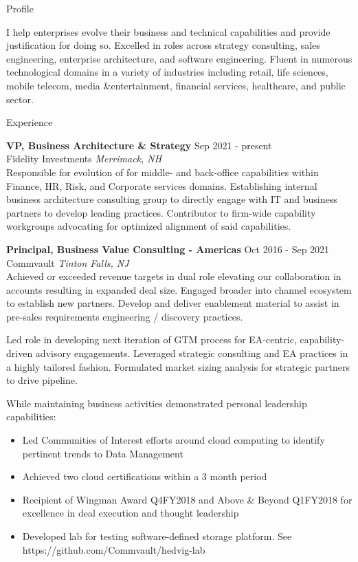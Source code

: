 \documentclass{resume} %
\begin{document}
\begin{rSection}{Profile}

I help enterprises evolve their business and technical capabilities and provide justification for doing so. Excelled in roles across strategy consulting, sales engineering, enterprise architecture, and software engineering. Fluent in numerous technological domains in a variety of industries including retail, life sciences, mobile telecom, media \&entertainment, financial services, healthcare, and public sector.

\end{rSection}

\begin{rSection}{Experience}

\textbf{VP, Business Architecture \& Strategy} \hfill Sep 2021 - present\\
Fidelity Investments \hfill \textit{Merrimack, NH}\\
Responsible for evolution of for middle- and back-office capabilities within Finance, HR, Risk, and Corporate services domains. Establishing internal business architecture consulting group to directly engage with IT and business partners to develop leading practices. Contributor to firm-wide capability workgroups advocating for optimized alignment of said capabilities.
 
\textbf{Principal, Business Value Consulting - Americas} \hfill Oct 2016 - Sep 2021\\
Commvault \hfill \textit{Tinton Falls, NJ}\\
Achieved or exceeded revenue targets in dual role elevating our collaboration in accounts resulting in expanded deal size.  Engaged broader into channel ecosystem to establish new partners. Develop and deliver enablement material to assist in pre-sales requirements engineering / discovery practices.

Led role in developing next iteration of GTM process for EA-centric, capability-driven advisory engagements. Leveraged strategic consulting and EA practices in a highly tailored fashion. Formulated market sizing analysis for strategic partners to drive pipeline.

While maintaining business activities demonstrated personal leadership capabilities:
\begin{itemize}
   \itemsep -3pt {} 
   \item Led Communities of Interest efforts around cloud computing to identify pertinent trends to Data Management
   \item Achieved two cloud certifications within a 3 month period
   \item Recipient of Wingman Award Q4FY2018 and Above \& Beyond Q1FY2018 for excellence in deal execution and thought leadership
   \item Developed lab for testing software-defined storage platform. See https://github.com/Commvault/hedvig-lab
\end{itemize}


\end{rSection}
\end{document}
